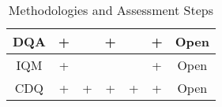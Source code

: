 \documentclass[pdftex,english,oribibl]{llncs}
\begin{document}
\begin{table}[]
\begin{tabular}{|c|c|c|c|c|c|c|}
DQA                                                         & +                                                       &                                                                     & +                                                                          &                                                            & +                                                                & Open                                                                                      \\ \hline
IQM                                                         & +                                                       &                                                                     &                                                                            &                                                            & +                                                                & Open                                                                                      \\ \hline
CDQ                                                         & +                                                       & +                                                                   & +                                                                          & +                                                          & +                                                                & Open                                                                                      \\ \hline
\end{tabular}
\caption{Methodologies and Assessment Steps}
\label{table:assessmentstep}
\end{table}
\end{document}
